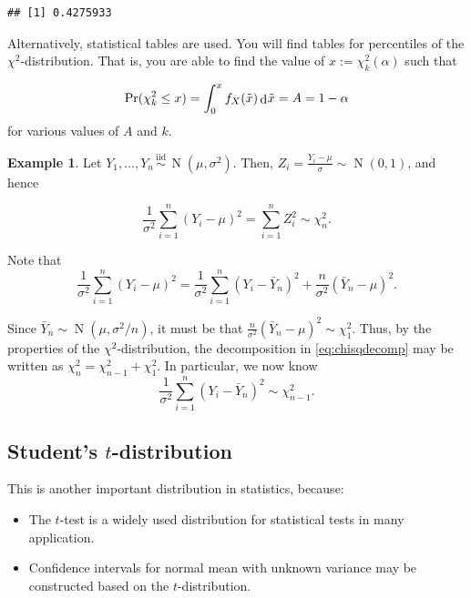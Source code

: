 \documentclass[
]{book}
\providecommand{\tightlist}{%
  \setlength{\itemsep}{0pt}\setlength{\parskip}{0pt}}
\DeclareMathOperator{\N}{N}
\newcommand{\iid}{\,\overset{\text{iid}}{\sim}\,}
\DeclareMathOperator{\dd}{d}
\newcommand{\dint}{\dd\hspace{0.5pt}\!}
\theoremstyle{definition}
\theoremstyle{definition}
\newtheorem{example}{Example}[chapter]
\theoremstyle{definition}
\theoremstyle{definition}
\theoremstyle{remark}
\begin{document}
\begin{verbatim}
## [1] 0.4275933
\end{verbatim}

Alternatively, statistical tables are used.
You will find tables for percentiles of the \(\chi^2\)-distribution.
That is, you are able to find the value of \(x:=\chi^2_k(\alpha)\) such that

\[\Pr(\chi_k^2 \leq x) = \int_0^x f_X(\tilde x) \dint \tilde x = A = 1-\alpha\]
for various values of \(A\) and \(k\).

\begin{example}
Let \(Y_1,\dots,Y_n\iid \N(\mu,\sigma^2)\).
Then, \(Z_i = \frac{Y_i-\mu}{\sigma} \sim \N(0,1)\), and hence

\[\frac{1}{\sigma^2} \sum_{i=1}^n (Y_i-\mu)^2 = \sum_{i=1}^n Z_i^2 \sim \chi^2_n .\]

Note that
\begin{equation}
    \frac{1}{\sigma^2} \sum_{i=1}^n (Y_i-\mu)^2
    = \frac{1}{\sigma^2} \sum_{i=1}^n (Y_i-\bar Y_n)^2 +  \frac{n}{\sigma^2} (\bar Y_n -\mu)^2. \label{eq:chisqdecomp}
\end{equation}

Since \(\bar Y_n \sim \N(\mu, \sigma^2/n)\), it must be that
\(\frac{n}{\sigma^2} (\bar Y_n -\mu)^2 \sim \chi^2_1\).
Thus, by the properties of the \(\chi^2\)-distribution, the decomposition in \eqref{eq:chisqdecomp} may be written as
\(\chi^2_n = \chi^2_{n-1} + \chi^2_{1}\).
In particular, we now know
\[\frac{1}{\sigma^2} \sum_{i=1}^n (Y_i-\bar Y_n)^2 \sim \chi^2_{n-1} .\]
\end{example}

\hypertarget{students-t-distribution}{%
\subsection{\texorpdfstring{Student's \(t\)-distribution}{Student's t-distribution}}\label{students-t-distribution}}

This is another important distribution in
statistics, because:

\begin{itemize}
\tightlist
\item
  The \(t\)-test is a widely used distribution for statistical tests in many
  application.
\item
  Confidence intervals for normal mean with unknown variance may be
  constructed based on the \(t\)-distribution.
\end{itemize}
\end{document}
